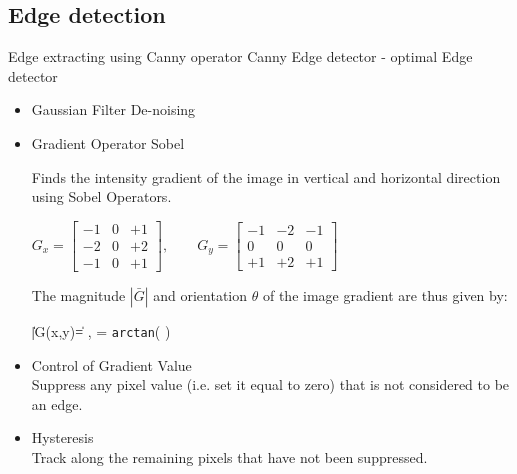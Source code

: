 \documentclass[8pt]{beamer}
\begin{document}
{{\subsection{Edge detection}
\begin{frame}{Edge extracting using Canny operator}
 Canny Edge detector -  optimal Edge detector %
 \begin{itemize}
 \setlength\itemsep{1em}
  \item Gaussian Filter De-noising
  \item Gradient Operator Sobel\\ \small{
	Finds the intensity gradient of the image in vertical and horizontal direction using Sobel Operators.\\
	\begin{center}
  $G_x = \begin{bmatrix}
      -1 & 0 & +1\\
      -2 & 0 & +2\\
      -1 & 0 & +1
      \end{bmatrix} , \qquad 
      G_y = \begin{bmatrix}
      -1 & -2 & -1\\
       0 &  0 &  0\\
      +1 & +2 & +1
      \end{bmatrix}$\\
      \end{center}
      The magnitude $|\bar{G}|$ and orientation $\theta$ of the image gradient are thus given by: \\[2pt]
   {\centering
   \|\bar{G}(x,y)\| =  ,\qquad   
    \theta = \texttt{arctan}\left( \right)
  \par}}
  \item Control of Gradient Value\\
	\small{Suppress any pixel value (i.e. set it equal to zero) that is not considered to be an edge.}
  \item Hysteresis\\
	\small{Track along the remaining pixels that have not been suppressed.}
 \end{itemize}

\end{frame}

}}
\end{document}
